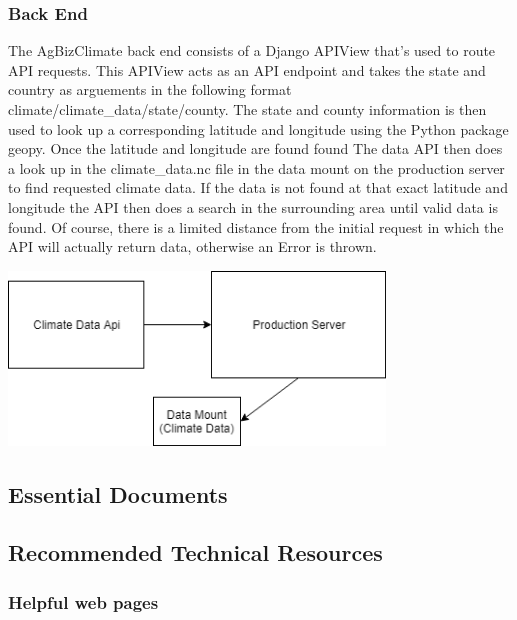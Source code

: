 \documentclass[onecolumn, draftclsnofoot,10pt, compsoc]{article}
\begin{document}
        \subsubsection{Back End}
        The AgBizClimate back end consists of a Django APIView that's used to route API requests. This APIView acts as an API endpoint and takes the state and country as arguements in the following format climate/climate\_data/state/county. The state and county information is then used to look up a corresponding latitude and longitude using the Python package geopy. Once the latitude and longitude are found found The data API then does a look up in the climate\_data.nc file in the data mount on the production server to find requested climate data. If the data is not found at that exact latitude and longitude the API then does a search in the surrounding area until valid data is found. Of course, there is a limited distance from the initial request in which the API will actually return data, otherwise an Error is thrown.
        \begin{center}
        \includegraphics[width=10cm]{./Images/backend.png}
        \end{center}
        
        
 
    \subsection{Essential Documents}
            

    \subsection{Recommended Technical Resources}
        \subsubsection{Helpful web pages}
\end{document}
